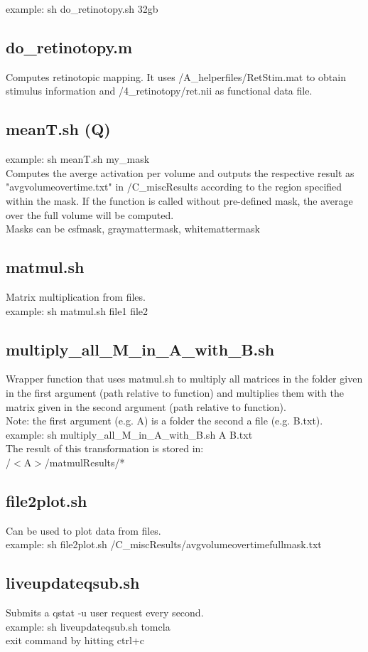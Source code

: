 \documentclass[12pt,a4paper]{scrartcl}
\begin{document}
example: sh do\_retinotopy.sh 32gb

\subsection{do\_retinotopy.m}
Computes retinotopic mapping. It uses /A\_helperfiles/RetStim.mat to obtain stimulus information and /4\_retinotopy/ret.nii as functional data file.

\subsection{meanT.sh (Q)}
example: sh meanT.sh my\_mask\\

\noindent Computes the averge activation per volume and outputs the respective result as "avgvolumeovertime.txt" in /C\_miscResults according to the region specified within the mask. If the function is called without pre-defined mask, the average over the full volume will be computed.\\

Masks can be csfmask, graymattermask, whitemattermask

\subsection{matmul.sh}
Matrix multiplication from files.\\

\noindent example: sh matmul.sh file1 file2

\subsection{multiply\_all\_M\_in\_A\_with\_B.sh}
Wrapper function that uses matmul.sh to multiply all matrices in the folder given in the first argument (path relative to function) and multiplies them with the matrix given in the second argument (path relative to function).\\

\noindent Note: the first argument (e.g. A) is a folder the second a file (e.g. B.txt).\\

\noindent example: sh multiply\_all\_M\_in\_A\_with\_B.sh A B.txt\\

\noindent The result of this transformation is stored in:\\

/$<$A$>$/matmulResults/* \\

\subsection{file2plot.sh}
Can be used to plot data from files.\\

example: sh file2plot.sh /C\_miscResults/avgvolumeovertimefullmask.txt

\subsection{liveupdateqsub.sh}
Submits a qstat -u user request every second.\\

example: sh liveupdateqsub.sh tomcla\\

\noindent exit command by hitting ctrl+c
\end{document}
